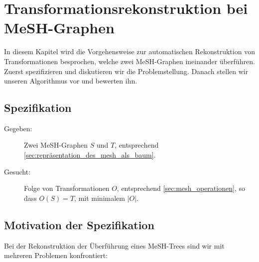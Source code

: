 \section{Transformationsrekonstruktion bei MeSH-Graphen}
\label{sec:vergleichBaume}
In diesem Kapitel wird die Vorgehensweise zur automatischen Rekonstruktion von Transformationen besprochen, welche zwei MeSH-Graphen ineinander überführen. Zuerst spezifizieren und diskutieren wir die Problemstellung. Danach stellen wir unseren Algorithmus vor und bewerten ihn.


\subsection{Spezifikation}
\label{sec:formale_Beschreibung}
\begin{description}
 \item [Gegeben:] Zwei MeSH-Graphen $S$ und $T$, entsprechend \autoref{sec:repräsentation_des_mesh_als_baum}.
 \item [Gesucht:] Folge von Transformationen $O$, entsprechend \autoref{sec:mesh_operationen}, so dass $O(S) = T$, mit minimalem $|O|$.
\end{description}


\subsection{Motivation der Spezifikation}
Bei der Rekonstruktion der Überführung eines MeSH-Trees sind wir mit mehreren Problemen konfrontiert:

